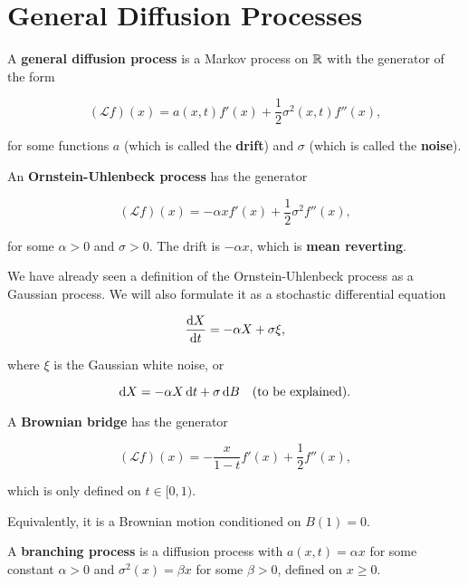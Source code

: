 \section{General Diffusion Processes}

\begin{definition}
    A \textbf{general diffusion process} is a Markov process on $\mathbb{R}$ with the generator of the form 

    \begin{equation*}
        (\mathcal{L}f)(x) = a(x, t) f'(x) + \frac{1}{2} \sigma^2 (x, t) f''(x),
    \end{equation*}

    for some functions $a$ (which is called the \textbf{drift}) and $\sigma$ (which is called the \textbf{noise}).
\end{definition}

\begin{example}
    An \textbf{Ornstein-Uhlenbeck process} has the generator 

    \begin{equation*}
        (\mathcal{L}f)(x) = - \alpha x f'(x) + \frac{1}{2} \sigma^2 f''(x),
    \end{equation*}

    for some $\alpha > 0$ and $\sigma > 0$. The drift is $-\alpha x$, which is \textbf{mean reverting}.

    \begin{remark}
        We have already seen a definition of the Ornstein-Uhlenbeck process as a Gaussian process. We will also formulate it as a stochastic differential equation 

        \begin{equation*}
            \frac{\dif X}{\dif t} = - \alpha X + \sigma \xi,
        \end{equation*}

        where $\xi$ is the Gaussian white noise, or 

        \begin{equation*}
            \dif X = - \alpha X \dif t + \sigma \dif B \quad (\text{to be explained}).
        \end{equation*}
    \end{remark}
\end{example}

\begin{example}
    A \textbf{Brownian bridge} has the generator 

    \begin{equation*}
        (\mathcal{L}f)(x) = - \frac{x}{1-t} f'(x) + \frac{1}{2} f''(x),
    \end{equation*}

    which is only defined on $t \in [0, 1)$. 

    Equivalently, it is a Brownian motion conditioned on $B(1) = 0$.
\end{example}

\begin{example}
    A \textbf{branching process} is a diffusion process with $a(x, t) = \alpha x$ for some constant $\alpha > 0$ and $\sigma^2(x) = \beta x$ for some $\beta > 0$, defined on $x \ge 0$.
\end{example}



